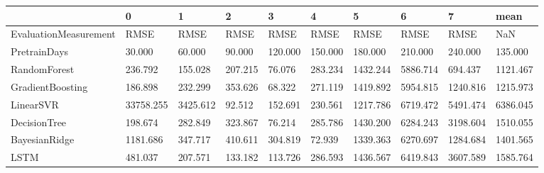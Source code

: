 \begin{tabular}{llllllllll}
\toprule
{} &         0 &        1 &       2 &       3 &       4 &        5 &        6 &        7 &     mean \\
\midrule
EvaluationMeasurement &      RMSE &     RMSE &    RMSE &    RMSE &    RMSE &     RMSE &     RMSE &     RMSE &      NaN \\
PretrainDays          &    30.000 &   60.000 &  90.000 & 120.000 & 150.000 &  180.000 &  210.000 &  240.000 &  135.000 \\
RandomForest          &   236.792 &  155.028 & 207.215 &  76.076 & 283.234 & 1432.244 & 5886.714 &  694.437 & 1121.467 \\
GradientBoosting      &   186.898 &  232.299 & 353.626 &  68.322 & 271.119 & 1419.892 & 5954.815 & 1240.816 & 1215.973 \\
LinearSVR             & 33758.255 & 3425.612 &  92.512 & 152.691 & 230.561 & 1217.786 & 6719.472 & 5491.474 & 6386.045 \\
DecisionTree          &   198.674 &  282.849 & 323.867 &  76.214 & 285.786 & 1430.200 & 6284.243 & 3198.604 & 1510.055 \\
BayesianRidge         &  1181.686 &  347.717 & 410.611 & 304.819 &  72.939 & 1339.363 & 6270.697 & 1284.684 & 1401.565 \\
LSTM                  &   481.037 &  207.571 & 133.182 & 113.726 & 286.593 & 1436.567 & 6419.843 & 3607.589 & 1585.764 \\
\bottomrule
\end{tabular}
